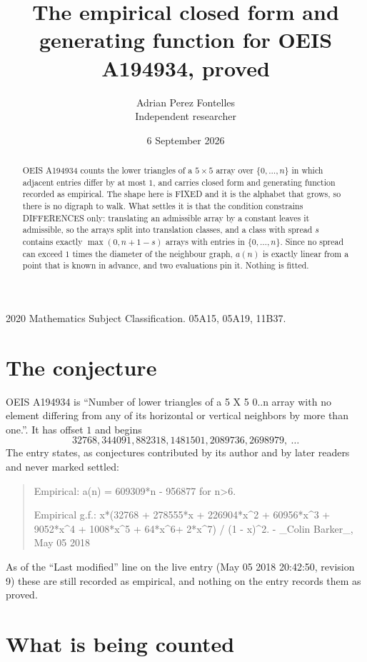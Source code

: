\documentclass[11pt,a4paper]{article}
\title{The empirical closed form and generating function for OEIS A194934, proved}
\author{Adrian Perez Fontelles\\ \small Independent researcher}
\date{6 September 2026}
\theoremstyle{plain}
\theoremstyle{definition}
\begin{document}
\maketitle

\begin{abstract}
OEIS A194934 counts the lower triangles of a $5\times5$ array over $\{0,\dots,n\}$ in which
adjacent entries differ by at most $1$, and carries closed form and generating function recorded as empirical. The shape here is FIXED
and it is the alphabet that grows, so there is no digraph to walk. What settles it is that the
condition constrains DIFFERENCES only: translating an admissible array by a constant leaves it
admissible, so the arrays split into translation classes, and a class with spread $s$ contains
exactly $\max(0,n+1-s)$ arrays with entries in $\{0,\dots,n\}$. Since no spread can exceed
$1$ times the diameter of the neighbour graph, $a(n)$ is exactly linear from a point that is
known in advance, and two evaluations pin it. Nothing is fitted.
\end{abstract}

\noindent\small 2020 Mathematics Subject Classification. 05A15, 05A19, 11B37.\normalsize

\section{The conjecture}

OEIS A194934 is ``Number of lower triangles of a 5 X 5 0..n array with no element differing from any of its horizontal or vertical neighbors by more than one.''. It has offset $1$ and begins
\[
32768, 344091, 882318, 1481501, 2089736, 2698979,\ \dots
\]
The entry states, as conjectures contributed by its author and by later readers and never
marked settled:
\begin{quote}
Empirical: a(n) = 609309*n - 956877 for n>6.

Empirical g.f.: x*(32768 + 278555*x + 226904*x\^{}2 + 60956*x\^{}3 + 9052*x\^{}4 + 1008*x\^{}5 + 64*x\^{}6+ 2*x\^{}7) / (1 - x)\^{}2. - \_Colin Barker\_, May 05 2018
\end{quote}
As of the ``Last modified'' line on the live entry (May 05 2018 20:42:50, revision 9) these are still
recorded as empirical, and nothing on the entry records them as proved.

\section{What is being counted}
\end{document}
